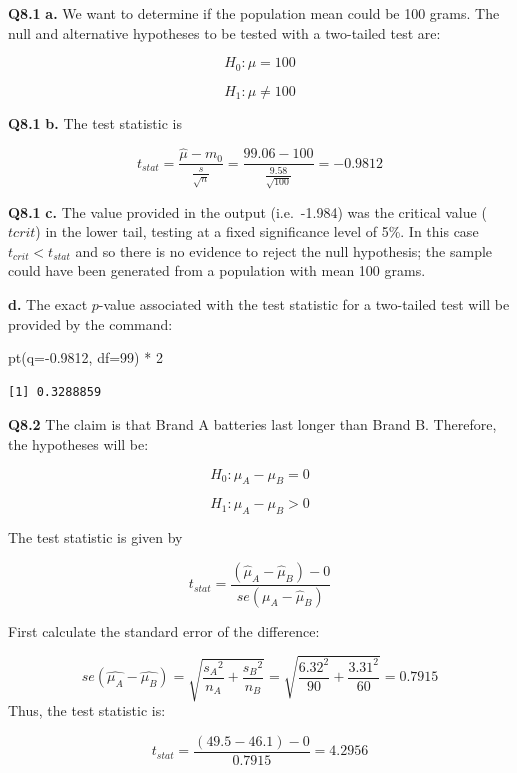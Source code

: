 \documentclass[
  oneside]{krantz}
\newenvironment{Shaded}{\begin{snugshade}}{\end{snugshade}}
\newcommand{\AttributeTok}[1]{\textcolor[rgb]{0.77,0.63,0.00}{#1}}
\newcommand{\DecValTok}[1]{\textcolor[rgb]{0.00,0.00,0.81}{#1}}
\newcommand{\FloatTok}[1]{\textcolor[rgb]{0.00,0.00,0.81}{#1}}
\newcommand{\FunctionTok}[1]{\textcolor[rgb]{0.00,0.00,0.00}{#1}}
\newcommand{\NormalTok}[1]{#1}
\newcommand{\SpecialCharTok}[1]{\textcolor[rgb]{0.00,0.00,0.00}{#1}}
\begin{document}
\textbf{Q8.1} \textbf{a.} We want to determine if the population mean could be 100 grams. The null and alternative hypotheses to be tested with a two-tailed test are:

\[H_0: \mu = 100\]

\[H_1: \mu \ne 100\]

\textbf{Q8.1} \textbf{b.} The test statistic is

\[t_{stat} = \frac{\hat \mu - m_0}{\frac{s}{\sqrt{n}}} = \frac{99.06 - 100}{\frac{9.58}{\sqrt{100}}} = -0.9812\]

\textbf{Q8.1} \textbf{c.} The value provided in the output (i.e.~-1.984) was the critical value (\(t{crit}\)) in the lower tail, testing at a fixed significance level of 5\%. In this case \(t_{crit} < t_{stat}\) and so there is no evidence to reject the null hypothesis; the sample could have been generated from a population with mean 100 grams.

\textbf{d.} The exact \(p\)-value associated with the test statistic for a two-tailed test will be provided by the command:

\begin{Shaded}
\begin{Highlighting}[]
\FunctionTok{pt}\NormalTok{(}\AttributeTok{q=}\SpecialCharTok{{-}}\FloatTok{0.9812}\NormalTok{, }\AttributeTok{df=}\DecValTok{99}\NormalTok{) }\SpecialCharTok{*} \DecValTok{2}
\end{Highlighting}
\end{Shaded}

\begin{verbatim}
[1] 0.3288859
\end{verbatim}

\textbf{Q8.2} The claim is that Brand A batteries last longer than Brand B. Therefore, the hypotheses will be:

\[H_0: \mu_A - \mu_B = 0\]

\[H_1: \mu_A - \mu_B > 0\]

The test statistic is given by

\[t_{stat} = \frac{(\hat \mu_A - \hat \mu_B) - 0}{se(\mu_A - \hat \mu_B)}\]

First calculate the standard error of the difference:

\[se(\hat{\mu_A} - \hat{\mu_B})= \sqrt{\frac{{s_A}^2}{{n_A}} + \frac{{s_B}^2}{{n_B}}} = \sqrt{\frac{6.32^2}{90} + \frac{3.31^2}{60}} = 0.7915\]
Thus, the test statistic is:

\[t_{stat} = \frac{(49.5 - 46.1) - 0}{0.7915} = 4.2956\]
\end{document}
